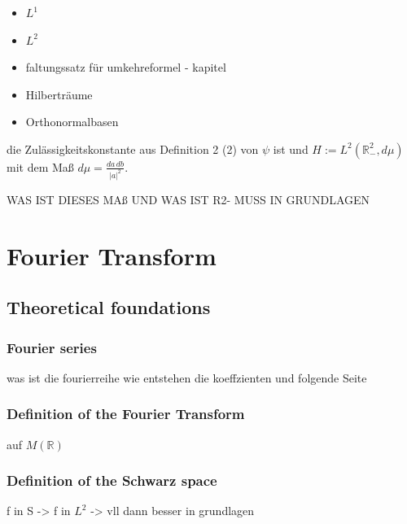 \documentclass[a4paper,11pt,bibliography=totoc,listof=totoc,headinclude=true,cleardoublepage=empty,oneside]{scrbook}
\theoremstyle{definition}
\theoremstyle{remark}
\begin{document}
\begin{itemize}
\item $L^1$
\item $L^2$
\item faltungssatz für umkehreformel - kapitel
\item Hilberträume
\item Orthonormalbasen
\end{itemize}

die Zulässigkeitskonstante aus Definition 2 (2) von $\psi$ ist und $H := L^2(\mathbb{R}^2_-, d\mu)$
   mit dem Maß $d\mu = \frac{da\,db}{|a|^2}$.

   WAS IST DIESES MAß UND WAS IST R2- MUSS IN GRUNDLAGEN






\chapter{Fourier Transform}

\section{Theoretical foundations}

 \subsection{Fourier series} %
  was ist die fourierreihe wie entstehen die koeffzienten
  \cite[Chapter 5, Section 1.1]{steinFourierAnalysisIntroduction2003a}
  \cite[Definition 2.1]{serovFourierSeriesFourier2017} und folgende Seite

 \subsection{Definition of the Fourier Transform} %
 auf $M(\mathbb{R})$
  \cite[Chapter 5, Section 1.2]{steinFourierAnalysisIntroduction2003a}
 
 \subsection{Definition of the Schwarz space} 
  f in S -> f in $L^2$ -> vll dann besser in grundlagen 
  \cite[Chapter 5, Section 1.3]{steinFourierAnalysisIntroduction2003a}
  \cite[Definition 16.1]{serovFourierSeriesFourier2017}
\end{document}
